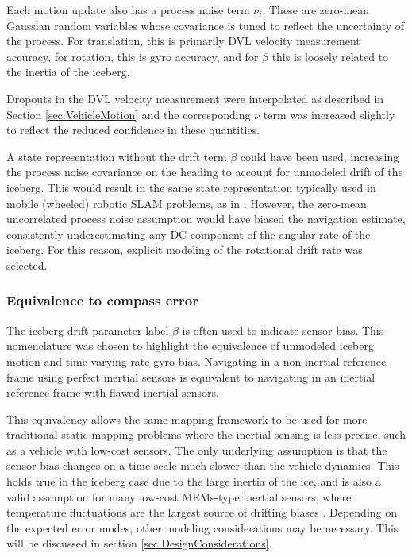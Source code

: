 Each motion update also has a process noise term $\nu_i$. These are zero-mean Gaussian random variables whose covariance is tuned to reflect the uncertainty of the process. For translation, this is primarily DVL velocity measurement accuracy, for rotation, this is gyro accuracy, and for $\beta$ this is loosely related to the inertia of the iceberg. 

Dropouts in the DVL velocity measurement were interpolated as described in Section \ref{sec:VehicleMotion} and the corresponding $\nu$ term was increased slightly to reflect the reduced confidence in these quantities.

A state representation without the drift term $\beta$ could have been used, increasing the process noise covariance on the heading to account for unmodeled drift of the iceberg. This would result in the same state representation typically used in mobile (wheeled) robotic SLAM problems, as in \cite{ProbRob}. However, the zero-mean uncorrelated process noise assumption would have biased the navigation estimate, consistently underestimating any DC-component of the angular rate of the iceberg. For this reason, explicit modeling of the rotational drift rate was selected.

\subsubsection{Equivalence to compass error}

The iceberg drift parameter label $\beta$ is often used to indicate sensor bias. This nomenclature was chosen to highlight the equivalence of unmodeled iceberg motion and time-varying rate gyro bias. Navigating in a non-inertial reference frame using perfect inertial sensors is equivalent to navigating in an inertial reference frame with flawed inertial sensors. 

This equivalency allows the same mapping framework to be used for more traditional static mapping problems where the inertial sensing is less precise, such as a vehicle with low-cost sensors. The only underlying assumption is that the sensor bias changes on a time scale much slower than the vehicle dynamics. This holds true in the iceberg case due to the large inertia of the ice, and is also a valid assumption for many low-cost MEMs-type inertial sensors, where temperature fluctuations are the largest source of drifting biases \cite{citationneeded}. Depending on the expected error modes, other modeling considerations may be necessary. This will be discussed in section \ref{sec.DesignConsiderations}.


